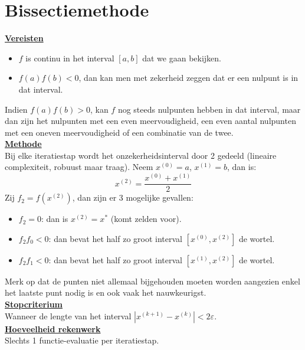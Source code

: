 \documentclass[11pt]{report}
\def \v {\vspace{2mm}}
\begin{document}
\section{Bissectiemethode}
	\underline{\textbf{Vereisten}}
	\begin{itemize}
		\item $f$ is continu in het interval $[a, b]$ dat we gaan bekijken.
		\item $f(a)f(b) < 0$, dan kan men met zekerheid zeggen dat er een nulpunt is in dat interval.
	\end{itemize}
	Indien $f(a)f(b) > 0$, kan $f$ nog steeds nulpunten hebben in dat interval, maar dan zijn het nulpunten met een even meervoudigheid, een even aantal nulpunten met een oneven meervoudigheid of een combinatie van de twee.\v\\
	\underline{\textbf{Methode}}\\
	Bij elke iteratiestap wordt het onzekerheidsinterval door 2 gedeeld (lineaire complexiteit, robuust maar traag). Neem $x^{(0)} = a$, $x^{(1)} = b$, dan is:
	$$x^{(2)} = \frac{x^{(0)} + x^{(1)}}{2}$$
	Zij $f_2 = f(x^{(2)})$, dan zijn er 3 mogelijke gevallen:
	\begin{itemize}
		\item $f_2 = 0$: \hspace{3.3mm}dan is $x^{(2)} = x^*$ (komt zelden voor).
		\item $f_2f_0 < 0$: dan bevat het half zo groot interval $[x^{(0)}, x^{(2)}]$ de wortel.
		\item $f_2f_1 < 0$: dan bevat het half zo groot interval $[x^{(1)}, x^{(2)}]$ de wortel.
	\end{itemize}
	Merk op dat de punten niet allemaal bijgehouden moeten worden aangezien enkel het laatste punt nodig is en ook vaak het nauwkeurigst.\v\\ 
	\underline{\textbf{Stopcriterium}}\\
	Wanneer de lengte van het interval $|x^{(k+1)} - x^{(k)}| < 2 \varepsilon$.\v\\ 
	\underline{\textbf{Hoeveelheid rekenwerk}}\\
	Slechts 1 functie-evaluatie per iteratiestap.
	
\end{document}
